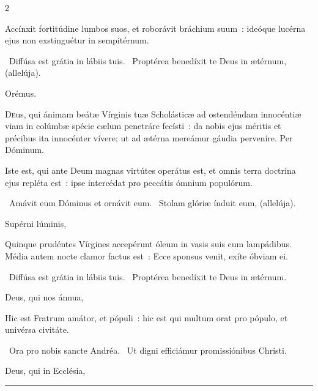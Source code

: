 \documentclass[9pt,twoside]{extarticle}
\begin{document}
\begin{multicols}{2}
\begin{tightlist}{}
\item {} Accínxit fortitúdine lumbos suos, et roborávit bráchium suum~: ideóque lucérna ejus non exstinguétur in sempitérnum.
\item {}~Diffúsa est grátia in lábiis tuis. ~Proptérea benedíxit te Deus in ætérnum, (allelúja).
\item Orémus. \hfill {}
\end{tightlist}
\lettrine{D}eus, qui ánimam beátæ Vírginis tuæ Scholásticæ ad ostendéndam innocéntiæ viam in colúmbæ spécie cælum penetráre fecísti~: da nobis ejus méritis et précibus ita innocénter vívere; ut ad ætérna mereámur gáudia perveníre. Per Dóminum.

\begin{tightlist}{}
\item {} Iste est, qui ante Deum magnas virtútes operátus est, et omnis terra doctrína ejus repléta est~: ipse intercédat pro peccátis ómnium populórum.
\item {}~Amávit eum Dóminus et ornávit eum. ~Stolam glóriæ índuit eum, (allelúja).
\item {} Supérni lúminis, 
\item {} Quinque prudéntes Vírgines accepérunt óleum in vasis suis cum lampádibus. Média autem nocte clamor factus est~: Ecce sponsus venit, exíte óbviam ei.
\item {}~Diffúsa est grátia in lábiis tuis. ~Proptérea benedíxit te Deus in ætérnum.
\item {} Deus, qui nos ánnua, 
\item {} Hic est Fratrum amátor, et pópuli~: hic est qui multum orat pro pópulo, et univérsa civitáte.
\item {}~Ora pro nobis sancte Andréa. ~Ut digni efficiámur promissiónibus Christi.
\item {} Deus, qui in Ecclésia, 
\item {}
\end{tightlist}


\begin{center}\textcolor{red}{\rule{\linewidth}{0.5pt}} \end{center}


\end{multicols}
\end{document}

